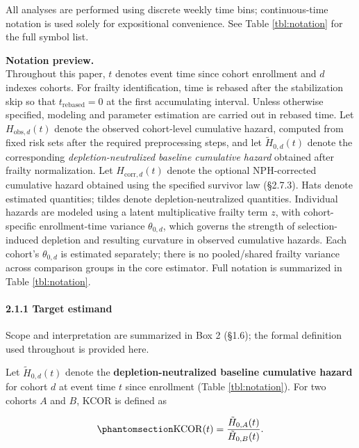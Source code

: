 \documentclass[
]{article}
\begin{document}
All analyses are performed using discrete weekly time bins; continuous-time notation is used solely for expositional convenience. See Table \ref{tbl:notation} for the full symbol list.

\textbf{Notation preview.}\\
Throughout this paper, \(t\) denotes event time since cohort enrollment and \(d\) indexes cohorts. For frailty identification, time is rebased after the stabilization skip so that \(t_{\mathrm{rebased}}=0\) at the first accumulating interval. Unless otherwise specified, modeling and parameter estimation are carried out in rebased time. Let \(H_{\mathrm{obs},d}(t)\) denote the observed cohort-level cumulative hazard, computed from fixed risk sets after the required preprocessing steps, and let \(\tilde H_{0,d}(t)\) denote the corresponding \emph{depletion-neutralized baseline cumulative hazard} obtained after frailty normalization. Let \(H_{\mathrm{corr},d}(t)\) denote the optional NPH-corrected cumulative hazard obtained using the specified survivor law (§2.7.3). Hats denote estimated quantities; tildes denote depletion-neutralized quantities. Individual hazards are modeled using a latent multiplicative frailty term \(z\), with cohort-specific enrollment-time variance \(\theta_{0,d}\), which governs the strength of selection-induced depletion and resulting curvature in observed cumulative hazards. Each cohort's \(\theta_{0,d}\) is estimated separately; there is no pooled/shared frailty variance across comparison groups in the core estimator. Full notation is summarized in Table \ref{tbl:notation}.

\paragraph{2.1.1 Target estimand}\label{target-estimand}

Scope and interpretation are summarized in Box 2 (§1.6); the formal definition used throughout is provided here.

Let \(\tilde H_{0,d}(t)\) denote the \textbf{depletion-neutralized baseline cumulative hazard} for cohort \(d\) at event time \(t\) since enrollment (Table \ref{tbl:notation}). For two cohorts \(A\) and \(B\), KCOR is defined as

\begin{equation}\protect\phantomsection\label{eq:kcor-estimand}{\mathrm{KCOR}(t) = \frac{\tilde H_{0,A}(t)}{\tilde H_{0,B}(t)}.}\end{equation}
\end{document}
